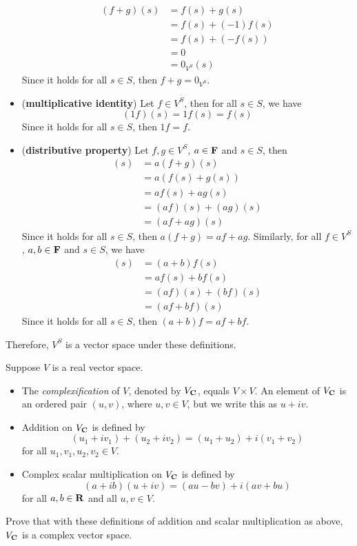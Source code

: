 \begin{solution}
\begin{itemize}
        \begin{align*}
            (f + g)(s) &= f(s) + g(s) \\
            &= f(s) + (-1)f(s) \\
            &= f(s) + (-f(s)) \\
            &= 0 \\
            &= 0_{V^S}(s)
        \end{align*}
        Since it holds for all $s \in S$, then $f + g = 0_{V^S}$.
        \item (\textbf{multiplicative identity}) Let $f \in V^S$, then for all $s \in S$, we have
        $$(1 f)(s) = 1 f(s) = f(s)$$
        Since it holds for all $s \in S$, then $1f = f$.
        \item (\textbf{distributive property}) Let $f,g \in V^S$, $a \in \mathbf{F}$ and $s \in S$, then
        \begin{align*}
            [a(f+g)](s) &= a(f+g)(s) \\
            &= a(f(s) + g(s)) \\
            &= a f(s) + ag(s) \\
            &= (af)(s) + (ag)(s) \\
            &= (af + ag)(s)
        \end{align*}
        Since it holds for all $s \in S$, then $a(f+g) = af + ag$. Similarly, for all $f \in V^S$, $a,b \in \mathbf{F}$ and $s \in S$, we have
        \begin{align*}
            [(a+b)f](s) &= (a+b)f(s) \\
            &= af(s) + bf(s) \\
            &= (af)(s) + (bf)(s) \\
            &= (af + bf)(s)
        \end{align*}
        Since it holds for all $s \in S$, then $(a+b)f = af + bf$.
    \end{itemize}
    Therefore, $V^S$ is a vector space under these definitions.\\
\end{solution}

\begin{exercise}
    Suppose $V$ is a real vector space.
    \begin{itemize}
        \item The \textit{complexification} of $V$, denoted by $V_{\mathbf{C}}$, equals $V \times V$. An element of $V_{\mathbf{C}}$ is an ordered pair $(u,v)$, where $u,v \in V$, but we write this as $u+iv$.
        \item Addition on $V_{\mathbf{C}}$ is defined by
        $$(u_1+iv_1) + (u_2 + iv_2) = (u_1 + u_2) + i(v_1 + v_2)$$
        for all $u_1, v_1, u_2, v_2 \in V$.
        \item Complex scalar multiplication on $V_{\mathbf{C}}$ is defined by 
        $$(a+ib)(u+iv) = (au - bv) + i(av + bu)$$
        for all $a,b \in \mathbf{R}$ and all $u,v\in V$.
    \end{itemize}
    Prove that with these definitions of addition and scalar multiplication as above, $V_{\mathbf{C}}$ is a complex vector space.\\
\end{exercise}

